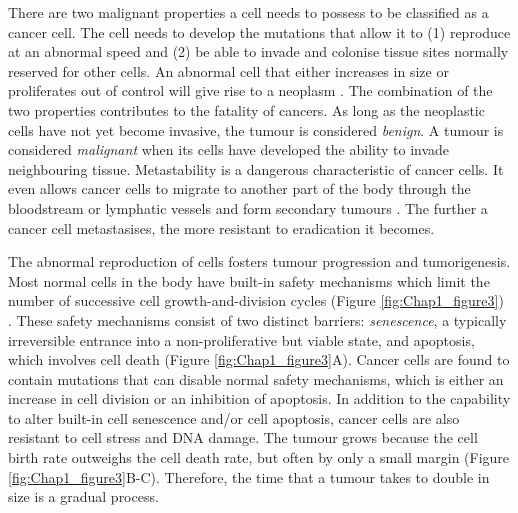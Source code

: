 There are two malignant properties a cell needs to possess to be classified as a cancer cell. The cell needs to develop the mutations that allow it to (1) reproduce at an abnormal speed and (2) be able to invade and colonise tissue sites normally reserved for other cells. An abnormal cell that either increases in size or proliferates out of control will give rise to a neoplasm \cite{alberts2018molecular, hanahan2000hallmarks}. The combination of the two properties contributes to the fatality of cancers. As long as the neoplastic cells have not yet become invasive, the tumour is considered \textit{benign}. A tumour is considered \textit{malignant} when its cells have developed the ability to invade neighbouring tissue. Metastability is a dangerous characteristic of cancer cells. It even allows cancer cells to migrate to another part of the body through the bloodstream or lymphatic vessels and form secondary tumours \cite{alberts2018molecular}. The further a cancer cell metastasises, the more resistant to eradication it becomes.   

The abnormal reproduction of cells fosters tumour progression and tumorigenesis. Most normal cells in the body have built-in safety mechanisms which limit the number of successive cell growth-and-division cycles (Figure \ref{fig:Chap1_figure3}) \cite{hanahan2000hallmarks, hanahan2011hallmarksnext}. These safety mechanisms consist of two distinct barriers: \textit{senescence}, a typically irreversible entrance into a non-proliferative but viable state, and apoptosis, which involves cell death (Figure \ref{fig:Chap1_figure3}A). Cancer cells are found to contain mutations that can disable normal safety mechanisms, which is either an increase in cell division or an inhibition of apoptosis. In addition to the capability to alter built-in cell senescence and/or cell apoptosis, cancer cells are also resistant to cell stress and DNA damage. The tumour grows because the cell birth rate outweighs the cell death rate, but often by only a small margin (Figure \ref{fig:Chap1_figure3}B-C). Therefore, the time that a tumour takes to double in size is a gradual process.

